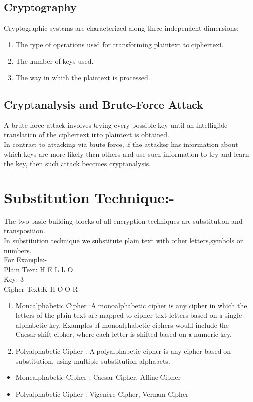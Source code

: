 \documentclass{article}
\begin{document}
\subsection{Cryptography}
Cryptographic systems are characterized along three independent dimensions:
\begin{enumerate}
    \item The type of operations used for transforming plaintext to ciphertext.
    \item The number of keys used.
    \item The way in which the plaintext is processed.
\end{enumerate}
\subsection{Cryptanalysis and Brute-Force Attack}
A brute-force attack involves trying every possible key until an intelligible translation of the ciphertext into plaintext is obtained.\\
In contrast to attacking via brute force, if the attacker has information about which keys are more likely than others and use such information to try and learn the key, then such attack becomes cryptanalysis.
\section{Substitution Technique:-}
The two basic building blocks of all encryption techniques are substitution and transposition.\\
In substitution technique we substitute plain text with other letters,symbols or numbers.\\
For Example:-\\
Plain Text: H E L L O\\
Key: 3\\
Cipher Text:K H O O R\\
\begin{enumerate}
    \item Monoalphabetic Cipher :A monoalphabetic cipher is any cipher in which the letters of the plain text are mapped to cipher text letters based on a single alphabetic key. Examples of monoalphabetic ciphers would include the Caesar-shift cipher, where each letter is shifted based on a numeric key.
    \item Polyalphabetic Cipher : A polyalphabetic cipher is any cipher based on substitution, using multiple substitution alphabets.
\end{enumerate}
\begin{itemize}
    \item Monoalphabetic Cipher : Caesar Cipher, Affine Cipher
    \item Polyalphabetic Cipher : Vigenère Cipher, Vernam Cipher
\end{itemize}
\end{document}
